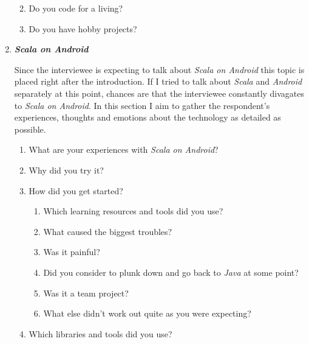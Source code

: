 \begin{enumerate}
\begin{enumerate}
\begin{enumerate}
		\end{enumerate}

		\item Do you code for a living?

		\item Do you have hobby projects?

	\end{enumerate}

	\item \textbf{\textit{Scala on Android}}

	Since the interviewee is expecting to talk about \textit{Scala on Android} this topic is placed right after the introduction. If I tried to talk about \textit{Scala} and \textit{Android} separately at this point, chances are that the interviewee constantly divagates to \textit{Scala on Android}. In this section I aim to gather the respondent's experiences, thoughts and emotions about the technology as detailed as possible.

	\begin{enumerate}

		\item What are your experiences with \textit{Scala on Android}?

		\item Why did you try it?

		\item How did you get started?

		\begin{enumerate}

			\item Which learning resources and tools did you use?

			\item What caused the biggest troubles?

			\item Was it painful?

			\item Did you consider to plunk down and go back to \textit{Java} at some point?

			\item Was it a team project?

			\item What else didn't work out quite as you were expecting?

		\end{enumerate}

		\item Which libraries and tools did you use?


\end{enumerate}
\end{enumerate}

